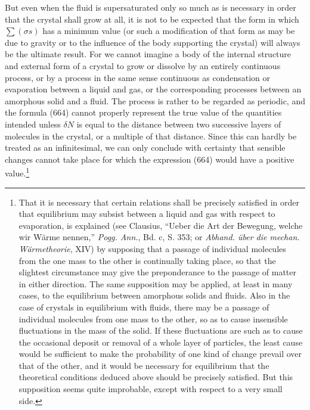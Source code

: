 \documentclass[12pt]{article}
\newcommand{\dd}{\delta}
\begin{document}
But even when the fluid is supersaturated only so much as is necessary in order that the crystal shall grow at all, it is not to be expected that the form in which $\sum(\sigma s)$ has a minimum value (or such a modification of that form as may be due to gravity or to the influence of the body supporting the crystal) will always be the ultimate result. For we cannot imagine a body of the internal structure and external form of a crystal to grow or dissolve by an entirely continuous process, or by a process in the same sense continuous as condensation or evaporation between a liquid and gas, or the corresponding processes between an amorphous solid and a fluid. The process is rather to be regarded as periodic, and the formula (664) cannot properly represent the true value of the quantities intended unless $\dd N$ is equal to the distance between two successive layers of molecules in the crystal, or a multiple of that distance. Since this can hardly be treated as an infinitesimal, we can only conclude with certainty that sensible changes cannot take place for which the expression (664) would have a positive value.\footnote{That it is necessary that certain relations shall be precisely satisfied in order that equilibrium may subsist between a liquid and gas with respect to evaporation, is explained (see Clausius, ``Ueber die Art der Bewegung, welche wir W\"{a}rme nennen,'' \textit{Pogg. Ann.}, Bd. c, S. 353; or \textit{Abhand. \"{u}ber die mechan. W\"{a}rmetheorie}, XIV) by supposing that a passage of individual molecules from the one mass to the other is continually taking place, so that the slightest circumstance may give the preponderance to the passage of matter in either direction.  The same supposition may be applied, at least in many cases, to the equilibrium between amorphous solids and fluids. Also in the case of crystals in equilibrium with fluids, there may be a passage of individual molecules from one mass to the other, so as to cause insensible fluctuations in the mass of the solid. If these fluctuations are such as to cause the occasional deposit or removal of a whole layer of particles, the least cause would be sufficient to make the probability of one kind of change prevail over that of the other, and it would be necessary for equilibrium that the theoretical conditions deduced above should be precisely satisfied. But this supposition seems quite improbable, except with respect to a very small side.\par
}
\end{document}
